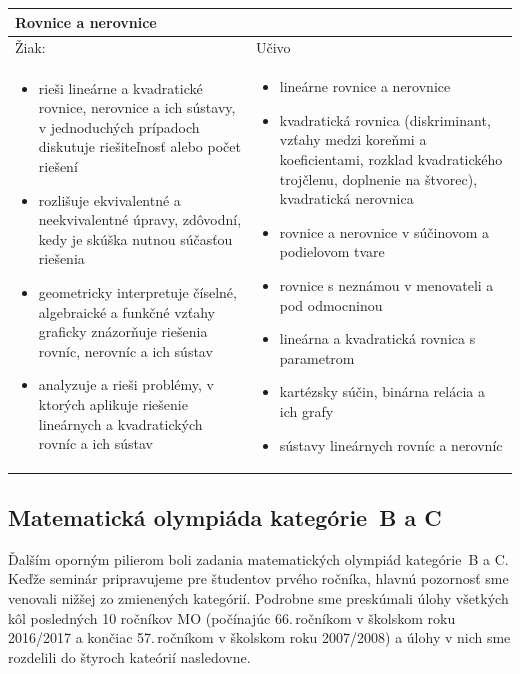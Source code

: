 \documentclass[11pt,a4paper,oneside,final]{book}
\begin{document}
\begin{tabularx}{\textwidth}{X X}
\hline
\multicolumn{2}{p{\textwidth}}{Rovnice a nerovnice} \\
\hline
Žiak: & Učivo \\
\begin{itemize}
\item rieši lineárne a kvadratické rovnice, nerovnice a ich sústavy, v jednoduchých prípadoch diskutuje riešiteľnosť alebo počet riešení
\item rozlišuje ekvivalentné a neekvivalentné úpravy, zdôvodní, kedy je skúška nutnou súčasťou riešenia
\item geometricky interpretuje číselné, algebraické a funkčné vzťahy graficky znázorňuje riešenia rovníc, nerovníc a ich sústav
\item analyzuje a rieši problémy, v ktorých aplikuje riešenie lineárnych a kvadratických rovníc a ich sústav
\end{itemize} &
\begin{itemize}
\item lineárne rovnice a nerovnice
\item kvadratická rovnica (diskriminant, vzťahy medzi koreňmi a koeficientami, rozklad kvadratického trojčlenu, doplnenie na štvorec), kvadratická nerovnica
\item rovnice a nerovnice v súčinovom a podielovom tvare
\item rovnice s neznámou v menovateli a pod odmocninou
\item lineárna a kvadratická rovnica s parametrom
\item kartézsky súčin, binárna relácia a ich grafy
\item sústavy lineárnych rovníc a nerovníc
\end{itemize}\\
\hline

\end{tabularx}

\subsection{Matematická olympiáda kategórie~B a C}

Ďalším oporným pilierom boli zadania matematických olympiád kategórie~B a C. Keďže seminár pripravujeme pre študentov prvého ročníka, hlavnú pozornosť sme venovali nižšej zo zmienených kategórií. Podrobne sme preskúmali úlohy všetkých kôl posledných 10 ročníkov MO (počínajúc 66.\,ročníkom v školskom roku 2016/2017 a končiac 57.\,ročníkom v školskom roku 2007/2008) a úlohy v nich sme rozdelili do štyroch kateórií nasledovne.
\end{document}
